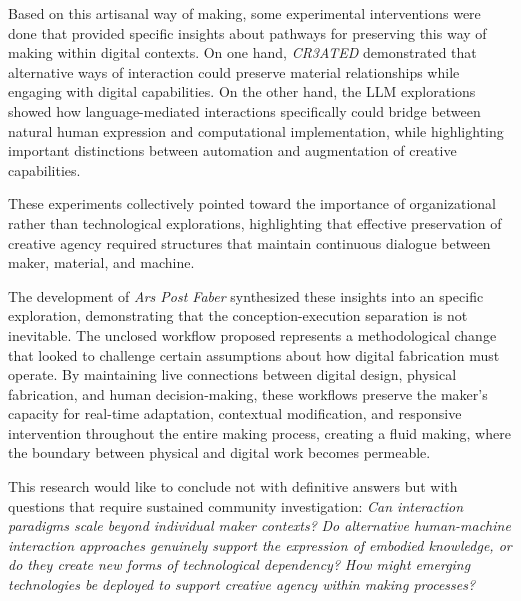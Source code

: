 Based on this artisanal way of making, some experimental interventions were done that provided specific insights about pathways for preserving this way of making within digital contexts. On one hand, \textit{CR3ATED} demonstrated that alternative ways of interaction could preserve material relationships while engaging with digital capabilities. On the other hand, the LLM explorations showed how language-mediated interactions specifically could bridge between natural human expression and computational implementation, while highlighting important distinctions between automation and augmentation of creative capabilities.

\vspace{0.5cm}

These experiments collectively pointed toward the importance of organizational rather than technological explorations, highlighting that effective preservation of creative agency required structures that maintain continuous dialogue between maker, material, and machine.

\vspace{0.5cm}

The development of \textit{Ars Post Faber} synthesized these insights into an specific exploration, demonstrating that the conception-execution separation is not inevitable. The unclosed workflow proposed represents a methodological change that looked to challenge certain assumptions about how digital fabrication must operate. By maintaining live connections between digital design, physical fabrication, and human decision-making, these workflows preserve the maker's capacity for real-time adaptation, contextual modification, and responsive intervention throughout the entire making process, creating a fluid making, where the boundary between physical and digital work becomes permeable.

\vspace{0.5cm}

This research would like to conclude not with definitive answers but with questions that require sustained community investigation: \textit{Can interaction paradigms scale beyond individual maker contexts?} \textit{Do alternative human-machine interaction approaches genuinely support the expression of embodied knowledge, or do they create new forms of technological dependency?} \textit{How might emerging technologies be deployed to support creative agency within making processes?}

\vspace{0.5cm}

